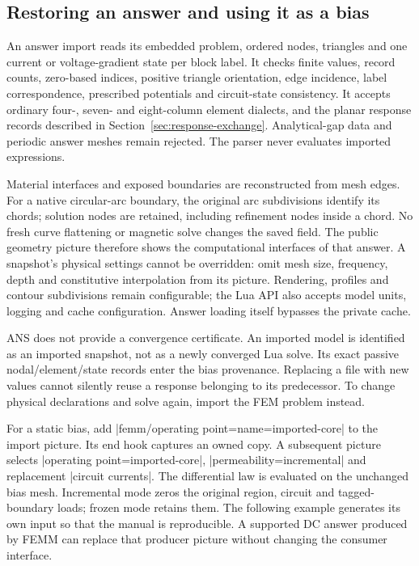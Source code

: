 \subsection{Restoring an answer and using it as a bias}

An answer import reads its embedded problem, ordered nodes, triangles and one
current or voltage-gradient state per block label. It checks finite values,
record counts, zero-based indices, positive triangle orientation, edge incidence,
label correspondence, prescribed potentials and circuit-state consistency. It
accepts ordinary four-, seven- and eight-column element dialects, and the
planar response records described in Section~\ref{sec:response-exchange}.
Analytical-gap data and periodic answer meshes remain rejected. The parser never evaluates imported expressions.

Material interfaces and exposed boundaries are reconstructed from mesh edges.
For a native circular-arc boundary, the original arc subdivisions identify its
chords; solution nodes are retained, including refinement nodes inside a chord.
No fresh curve flattening or magnetic solve changes the saved field. The public
geometry picture therefore shows the computational interfaces of that answer.
A snapshot's physical settings cannot be overridden: omit mesh size, frequency,
depth and constitutive interpolation from its picture. Rendering, profiles and
contour subdivisions remain configurable; the Lua API also accepts model units,
logging and cache configuration. Answer loading itself bypasses the private cache.

ANS does not provide a convergence certificate. An imported model is identified
as an imported snapshot, not as a newly converged Lua solve. Its exact passive
nodal/element/state records enter the bias provenance. Replacing a file with new
values cannot silently reuse a response belonging to its predecessor. To change
physical declarations and solve again, import the FEM problem instead.

For a static bias, add |femm/operating point={name=imported-core}| to the import
picture. Its end hook captures an owned copy. A subsequent picture selects
|operating point=imported-core|, |permeability=incremental| and replacement
|circuit currents|. The differential law is evaluated on the unchanged bias mesh.
Incremental mode zeros the original region, circuit and tagged-boundary loads;
frozen mode retains them. The following example generates its own input
so that the manual is reproducible. A supported DC answer produced by FEMM can
replace that producer picture without changing the consumer interface.

